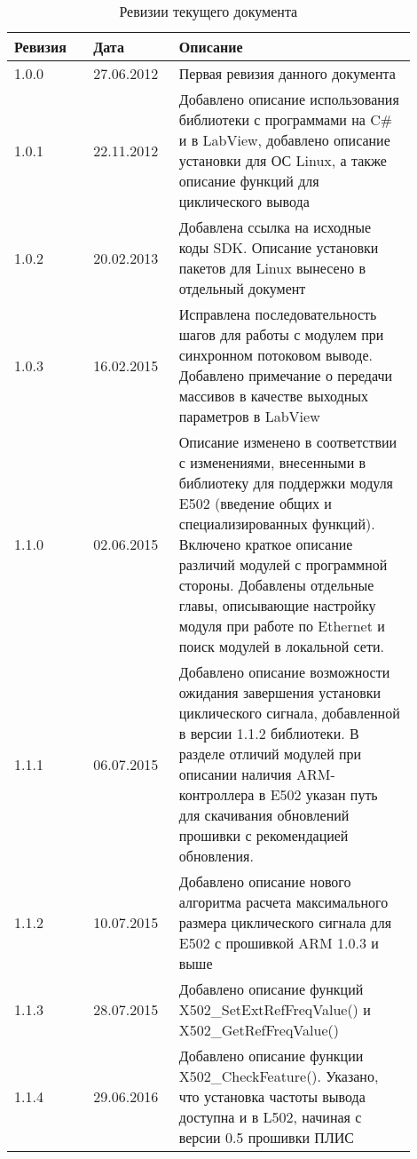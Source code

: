 \documentclass[12pt,a4paper,titlepage]{report}
\begin{document}
  
  \begin{longtable}{|m{0.18\linewidth}|m{0.18\linewidth}|m{0.54\linewidth}|}
  \caption{Ревизии текущего документа}\\\hline
  \textbf{Ревизия} & \textbf{Дата} & \textbf{Описание}\\\hline
  1.0.0            & 27.06.2012    & Первая ревизия данного документа \\\hline
  1.0.1            & 22.11.2012    & Добавлено описание использования библиотеки с программами на C\# и в LabView, добавлено описание установки для ОС Linux, а также описание функций для циклического вывода \\\hline
  1.0.2            & 20.02.2013    & Добавлена ссылка на исходные коды SDK. Описание установки пакетов для Linux вынесено в отдельный документ \\\hline
  1.0.3            & 16.02.2015    & Исправлена последовательность шагов для работы с модулем при синхронном потоковом выводе. Добавлено примечание о передачи массивов в качестве выходных параметров в LabView \\\hline
  1.1.0            & 02.06.2015    & Описание изменено в соответствии с изменениями, внесенными в библиотеку для поддержки модуля E502 (введение общих и специализированных функций). Включено краткое описание различий модулей с программной стороны. Добавлены отдельные главы, описывающие настройку модуля при работе по Ethernet и поиск модулей в локальной сети. \\\hline
  1.1.1            & 06.07.2015    & Добавлено описание возможности ожидания завершения установки циклического сигнала, добавленной в версии 1.1.2 библиотеки. В разделе отличий модулей при описании наличия ARM-контроллера в E502 указан путь для скачивания обновлений прошивки с рекомендацией обновления. \\\hline
  1.1.2            & 10.07.2015    & Добавлено описание нового алгоритма расчета максимального размера циклического сигнала для E502 с прошивкой ARM 1.0.3 и выше \\\hline
  1.1.3            & 28.07.2015    & Добавлено описание функций X502\_SetExtRefFreqValue() и X502\_GetRefFreqValue() \\\hline
  1.1.4            & 29.06.2016    &  Добавлено описание функции X502\_CheckFeature(). Указано, что установка частоты вывода доступна и в L502, начиная с версии 0.5 прошивки ПЛИС \\\hline
  \end{longtable}
  \newpage  
  
\end{document}
